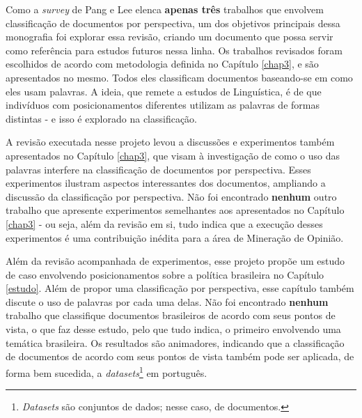 Como a \emph{survey} de Pang e Lee elenca \textbf{apenas três} trabalhos que envolvem classificação de documentos por perspectiva, um dos objetivos principais dessa monografia foi explorar essa revisão, criando um documento que possa servir como referência para estudos futuros nessa linha. Os trabalhos revisados foram escolhidos de acordo com metodologia definida no Capítulo \ref{chap3}, e são apresentados no mesmo. Todos eles classificam documentos baseando-se em como eles usam palavras. A ideia, que remete a estudos de Linguística, é de que indivíduos com posicionamentos diferentes utilizam as palavras de formas distintas  \cite{teubert} - e isso é explorado na classificação. 

A revisão executada nesse projeto levou a discussões e experimentos também apresentados no Capítulo \ref{chap3}, que visam à investigação de como o uso das palavras interfere na classificação de documentos por perspectiva. Esses experimentos ilustram aspectos interessantes dos documentos, ampliando a discussão da classificação por perspectiva. Não foi encontrado \textbf{nenhum} outro trabalho que apresente experimentos semelhantes aos apresentados no Capítulo \ref{chap3} - ou seja, além da revisão em si, tudo indica que a execução desses experimentos é uma contribuição inédita para a área de Mineração de Opinião. 

Além da revisão acompanhada de experimentos, esse projeto propõe um estudo de caso envolvendo posicionamentos sobre a política brasileira no Capítulo \ref{estudo}. Além de propor uma classificação por perspectiva, esse capítulo também discute o uso de palavras por cada uma delas. Não foi encontrado \textbf{nenhum} trabalho que classifique documentos brasileiros de acordo com seus pontos de vista, o que faz desse estudo, pelo que tudo indica, o primeiro envolvendo uma temática brasileira. Os resultados são animadores, indicando que a classificação de documentos de acordo com seus pontos de vista também pode ser aplicada, de forma bem sucedida, a \emph{datasets}\footnote{\emph{Datasets} são conjuntos de dados; nesse caso, de documentos.} em português.


